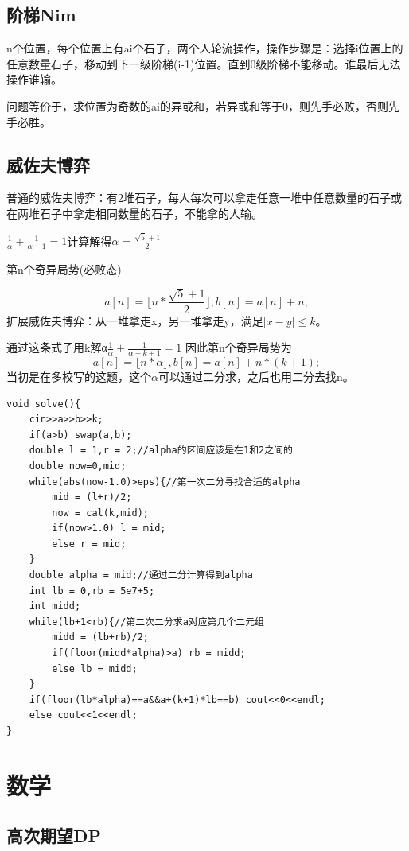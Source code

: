 \documentclass[a4]{ctexart}
\begin{document}
\subsection{阶梯Nim}
n个位置，每个位置上有ai个石子，两个人轮流操作，操作步骤是：选择i位置上的任意数量石子，移动到下一级阶梯(i-1)位置。直到0级阶梯不能移动。谁最后无法操作谁输。\par
问题等价于，求位置为奇数的ai的异或和，若异或和等于0，则先手必败，否则先手必胜。

\subsection{威佐夫博弈}
普通的威佐夫博弈：有2堆石子，每人每次可以拿走任意一堆中任意数量的石子或在两堆石子中拿走相同数量的石子，不能拿的人输。\par
$\frac{1}{\alpha}+\frac{1}{\alpha+1}=1$计算解得$\alpha =\frac{\sqrt{5}+1}{2}$\par
第n个奇异局势(必败态)\par
$$a[n]=\lfloor n*\frac{\sqrt{5}+1}{2}\rfloor,b[n]=a[n]+n;$$
扩展威佐夫博弈：从一堆拿走x，另一堆拿走y，满足$|x-y|\leq k$。\par
通过这条式子用k解α$\frac{1}{\alpha}+\frac{1}{\alpha +k+1}=1$
因此第n个奇异局势为
$$a[n]=\lfloor n*\alpha \rfloor,b[n]=a[n]+n*(k+1);$$
当初是在多校写的这题，这个$\alpha$可以通过二分求，之后也用二分去找n。
\begin{lstlisting}
void solve(){
    cin>>a>>b>>k;
    if(a>b) swap(a,b);
    double l = 1,r = 2;//alpha的区间应该是在1和2之间的 
    double now=0,mid;
    while(abs(now-1.0)>eps){//第一次二分寻找合适的alpha 
        mid = (l+r)/2;
        now = cal(k,mid);
        if(now>1.0) l = mid;
        else r = mid;
    }
    double alpha = mid;//通过二分计算得到alpha 
    int lb = 0,rb = 5e7+5;
    int midd;
    while(lb+1<rb){//第二次二分求a对应第几个二元组 
        midd = (lb+rb)/2;
        if(floor(midd*alpha)>a) rb = midd;
        else lb = midd;
    } 
    if(floor(lb*alpha)==a&&a+(k+1)*lb==b) cout<<0<<endl;
    else cout<<1<<endl;
}
\end{lstlisting}

 
\section{数学}
\subsection{高次期望DP}
\end{document}

